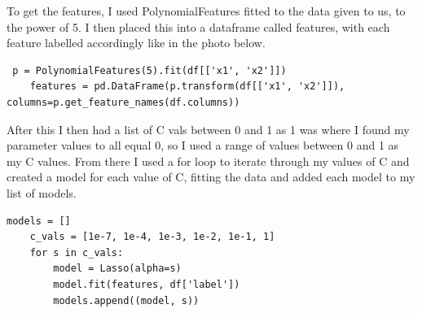 \documentclass[11pt]{article} %
\begin{document}
To get the features, I used PolynomialFeatures fitted to the data given to us, to the power of 5. I then placed this into a dataframe called features, with each feature labelled accordingly like in the photo below.
\begin{verbatim}
 p = PolynomialFeatures(5).fit(df[['x1', 'x2']])
    features = pd.DataFrame(p.transform(df[['x1', 'x2']]), columns=p.get_feature_names(df.columns))
\end{verbatim}
After this I then had a list of C vals between 0 and 1 as 1 was where I found my parameter values to all equal 0, so I used a range of values between 0 and 1 as my C values. From there I used a for loop to iterate through my values of C and created a model for each value of C, fitting the data and added each model to my list of models. 
\begin{verbatim}
models = []
    c_vals = [1e-7, 1e-4, 1e-3, 1e-2, 1e-1, 1]
    for s in c_vals:
        model = Lasso(alpha=s)
        model.fit(features, df['label'])
        models.append((model, s))
\end{verbatim}
\end{document}
